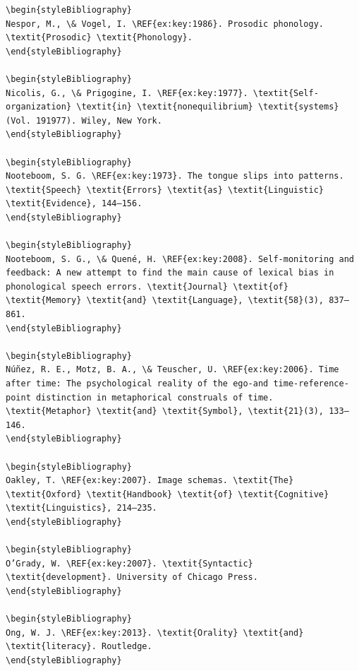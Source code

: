 \begin{verbatim}
\begin{styleBibliography}
Nespor, M., \& Vogel, I. \REF{ex:key:1986}. Prosodic phonology. \textit{Prosodic} \textit{Phonology}.
\end{styleBibliography}

\begin{styleBibliography}
Nicolis, G., \& Prigogine, I. \REF{ex:key:1977}. \textit{Self-organization} \textit{in} \textit{nonequilibrium} \textit{systems} (Vol. 191977). Wiley, New York.
\end{styleBibliography}

\begin{styleBibliography}
Nooteboom, S. G. \REF{ex:key:1973}. The tongue slips into patterns. \textit{Speech} \textit{Errors} \textit{as} \textit{Linguistic} \textit{Evidence}, 144–156.
\end{styleBibliography}

\begin{styleBibliography}
Nooteboom, S. G., \& Quené, H. \REF{ex:key:2008}. Self-monitoring and feedback: A new attempt to find the main cause of lexical bias in phonological speech errors. \textit{Journal} \textit{of} \textit{Memory} \textit{and} \textit{Language}, \textit{58}(3), 837–861.
\end{styleBibliography}

\begin{styleBibliography}
Núñez, R. E., Motz, B. A., \& Teuscher, U. \REF{ex:key:2006}. Time after time: The psychological reality of the ego-and time-reference-point distinction in metaphorical construals of time. \textit{Metaphor} \textit{and} \textit{Symbol}, \textit{21}(3), 133–146.
\end{styleBibliography}

\begin{styleBibliography}
Oakley, T. \REF{ex:key:2007}. Image schemas. \textit{The} \textit{Oxford} \textit{Handbook} \textit{of} \textit{Cognitive} \textit{Linguistics}, 214–235.
\end{styleBibliography}

\begin{styleBibliography}
O’Grady, W. \REF{ex:key:2007}. \textit{Syntactic} \textit{development}. University of Chicago Press.
\end{styleBibliography}

\begin{styleBibliography}
Ong, W. J. \REF{ex:key:2013}. \textit{Orality} \textit{and} \textit{literacy}. Routledge.
\end{styleBibliography}


\end{verbatim}
